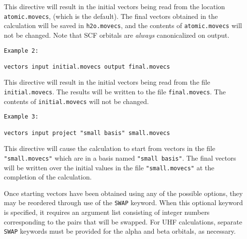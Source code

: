 This directive will result in the initial vectors being read from the 
location \verb+atomic.movecs+, (which is the default).  The final vectors 
obtained in the calculation
will be saved in \verb+h2o.movecs+, and the contents of \verb+atomic.movecs+
will not be changed.  Note that SCF orbitals are {\em always}
canonicalized on output.



\begin{verbatim}
Example 2:

vectors input initial.movecs output final.movecs
\end{verbatim}

This directive will result in the initial vectors being read from the file
\verb+initial.movecs+.  The results will be written to the file
\verb+final.movecs+.  The contents of \verb+initial.movecs+ will not be
changed.

\begin{verbatim}
Example 3:

vectors input project "small basis" small.movecs
\end{verbatim}

This directive will cause the calculation to start from vectors in the
file \verb+"small.movecs"+ which are in a basis named \verb+"small basis"+.
The final vectors will be written over the initial values in the file
\verb+"small.movecs"+ at the completion of the calculation.
 

Once starting vectors have been obtained using any of the possible
options, they may be reordered through use of the \verb+SWAP+ keyword.
When this optional keyword is specified, it requires an
argument list consisting of integer numbers corresponding to the pairs 
that will be swapped.
For UHF calculations, separate \verb+SWAP+ keywords must be provided
for the alpha and beta orbitals, as necessary.

